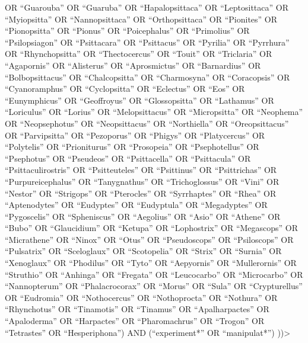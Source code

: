 \documentclass[
  number,
  review,
  onecolumn]{elsarticle}
\begin{document}
OR ``Guarouba'' OR ``Guaruba'' OR ``Hapalopsittaca'' OR ``Leptosittaca''
OR ``Myiopsitta'' OR ``Nannopsittaca'' OR ``Orthopsittaca'' OR
``Pionites'' OR ``Pionopsitta'' OR ``Pionus'' OR ``Poicephalus'' OR
``Primolius'' OR ``Psilopsiagon'' OR ``Psittacara'' OR ``Psittacus'' OR
``Pyrilia'' OR ``Pyrrhura'' OR ``Rhynchopsitta'' OR ``Thectocercus'' OR
``Touit'' OR ``Triclaria'' OR ``Agapornis'' OR ``Alisterus'' OR
``Aprosmictus'' OR ``Barnardius'' OR ``Bolbopsittacus'' OR
``Chalcopsitta'' OR ``Charmosyna'' OR ``Coracopsis'' OR ``Cyanoramphus''
OR ``Cyclopsitta'' OR ``Eclectus'' OR ``Eos'' OR ``Eunymphicus'' OR
``Geoffroyus'' OR ``Glossopsitta'' OR ``Lathamus'' OR ``Loriculus'' OR
``Lorius'' OR ``Melopsittacus'' OR ``Micropsitta'' OR ``Neophema'' OR
``Neopsephotus'' OR ``Neopsittacus'' OR ``Northiella'' OR
``Oreopsittacus'' OR ``Parvipsitta'' OR ``Pezoporus'' OR ``Phigys'' OR
``Platycercus'' OR ``Polytelis'' OR ``Prioniturus'' OR ``Prosopeia'' OR
``Psephotellus'' OR ``Psephotus'' OR ``Pseudeos'' OR ``Psittacella'' OR
``Psittacula'' OR ``Psittaculirostris'' OR ``Psitteuteles'' OR
``Psittinus'' OR ``Psittrichas'' OR ``Purpureicephalus'' OR
``Tanygnathus'' OR ``Trichoglossus'' OR ``Vini'' OR ``Nestor'' OR
``Strigops'' OR ``Pterocles'' OR ``Syrrhaptes'' OR ``Rhea'' OR
``Aptenodytes'' OR ``Eudyptes'' OR ``Eudyptula'' OR ``Megadyptes'' OR
``Pygoscelis'' OR ``Spheniscus'' OR ``Aegolius'' OR ``Asio'' OR
``Athene'' OR ``Bubo'' OR ``Glaucidium'' OR ``Ketupa'' OR ``Lophostrix''
OR ``Megascops'' OR ``Micrathene'' OR ``Ninox'' OR ``Otus'' OR
``Pseudoscops'' OR ``Psiloscops'' OR ``Pulsatrix'' OR ``Sceloglaux'' OR
``Scotopelia'' OR ``Strix'' OR ``Surnia'' OR ``Xenoglaux'' OR
``Phodilus'' OR ``Tyto'' OR ``Aepyornis'' OR ``Mullerornis'' OR
``Struthio'' OR ``Anhinga'' OR ``Fregata'' OR ``Leucocarbo'' OR
``Microcarbo'' OR ``Nannopterum'' OR ``Phalacrocorax'' OR ``Morus'' OR
``Sula'' OR ``Crypturellus'' OR ``Eudromia'' OR ``Nothocercus'' OR
``Nothoprocta'' OR ``Nothura'' OR ``Rhynchotus'' OR ``Tinamotis'' OR
``Tinamus'' OR ``Apalharpactes'' OR ``Apaloderma'' OR ``Harpactes'' OR
``Pharomachrus'' OR ``Trogon'' OR ``Tetrastes'' OR ``Hesperiphona'') AND
(``experiment*'' OR ``manipulat*'') ))\textgreater{}
\end{document}
